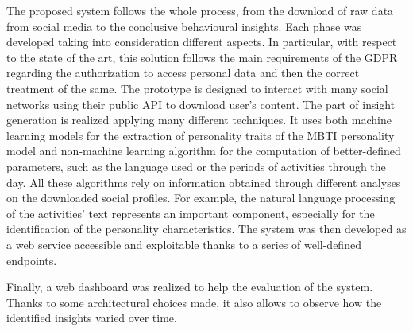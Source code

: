The proposed system follows the whole process, from the download of raw data from social media to the conclusive behavioural insights. 
Each phase was developed taking into consideration different aspects. In particular, with respect to the state of the art, this solution follows the main requirements of the GDPR regarding the authorization to access personal data and then the correct treatment of the same.
The prototype is designed to interact with many social networks using their public API to download user's content. The part of insight generation is realized applying many different techniques.
It uses both machine learning models for the extraction of personality traits of the MBTI personality model and non-machine learning algorithm for the computation of better-defined parameters, such as the language used or the periods of activities through the day.
All these algorithms rely on information obtained through different analyses on the downloaded social profiles. For example, the natural language processing of the activities' text represents an important component, especially for the identification of the personality characteristics.
The system was then developed as a web service accessible and exploitable thanks to a series of well-defined endpoints.

Finally, a web dashboard was realized to help the evaluation of the system. Thanks to some architectural choices made, it also allows to observe how the identified insights varied over time.